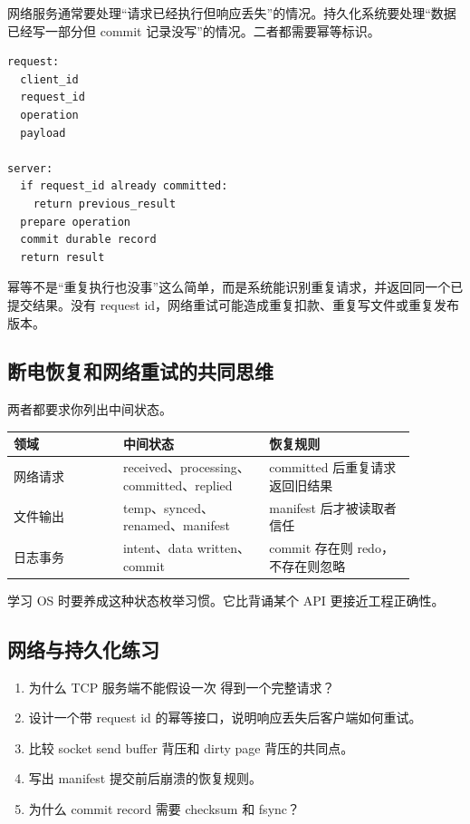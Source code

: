 网络服务通常要处理“请求已经执行但响应丢失”的情况。持久化系统要处理“数据已经写一部分但 commit 记录没写”的情况。二者都需要幂等标识。

\begin{lstlisting}
request:
  client_id
  request_id
  operation
  payload

server:
  if request_id already committed:
    return previous_result
  prepare operation
  commit durable record
  return result
\end{lstlisting}

幂等不是“重复执行也没事”这么简单，而是系统能识别重复请求，并返回同一个已提交结果。没有 request id，网络重试可能造成重复扣款、重复写文件或重复发布版本。

\subsection{断电恢复和网络重试的共同思维}

两者都要求你列出中间状态。

\begin{longtable}{|p{0.24\linewidth}|p{0.32\linewidth}|p{0.32\linewidth}|}
\toprule
领域 & 中间状态 & 恢复规则 \\
\midrule
网络请求 & received、processing、committed、replied & committed 后重复请求返回旧结果 \\\tablerowrule
文件输出 & temp、synced、renamed、manifest & manifest 后才被读取者信任 \\\tablerowrule
日志事务 & intent、data written、commit & commit 存在则 redo，不存在则忽略 \\
\bottomrule
\end{longtable}

学习 OS 时要养成这种状态枚举习惯。它比背诵某个 API 更接近工程正确性。

\subsection{网络与持久化练习}

\begin{enumerate}
\tightlist
\item 为什么 TCP 服务端不能假设一次  得到一个完整请求？
\item 设计一个带 request id 的幂等接口，说明响应丢失后客户端如何重试。
\item 比较 socket send buffer 背压和 dirty page 背压的共同点。
\item 写出 manifest 提交前后崩溃的恢复规则。
\item 为什么 commit record 需要 checksum 和 fsync？
\end{enumerate}

